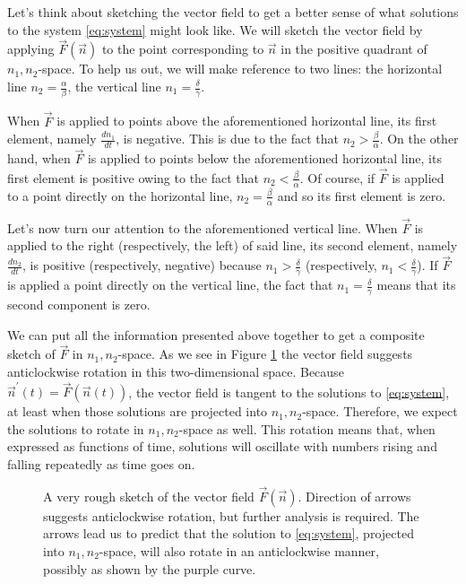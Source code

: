 \documentclass[../book.tex]{subfiles}
\begin{document}
Let's think about sketching the vector field to get a better sense of what solutions to the system \eqref{eq:system} might look like. We will sketch the vector field by applying \(\vec{F}(\vec{n})\) to the point corresponding to \(\vec{n}\) in the positive quadrant of \(n_1,n_2\)-space. To help us out, we will make reference to two lines: the horizontal line \(n_2 = \frac{\alpha}{\beta}\), the vertical line \(n_1 = \frac{\delta}{\gamma}\).

When \(\vec{F}\) is applied to points above the aforementioned horizontal line, its first element, namely \(\frac{dn_1}{dt}\), is negative. This is due to the fact that \(n_2 > \frac{\beta}{\alpha}\). On the other hand, when \(\vec{F}\) is applied to points below the aforementioned horizontal line, its first element is positive owing to the fact that \(n_2 < \frac{\beta}{\alpha}\). Of course, if \(\vec{F}\) is applied to a point directly on the horizontal line, \(n_2 = \frac{\beta}{\alpha}\) and so its first element is zero.

Let's now turn our attention to the aforementioned vertical line. When \(\vec{F}\) is applied to the right (respectively, the left) of said line, its second element, namely \(\frac{dn_2}{dt}\), is positive (respectively, negative) because \(n_1 > \frac{\delta}{\gamma}\) (respectively, \(n_1 < \frac{\delta}{\gamma}\)). If \(\vec{F}\) is applied a point directly on the vertical line, the fact that \(n_1 = \frac{\delta}{\gamma}\) means that its second component is zero.

We can put all the information presented above together to get a composite sketch of \(\vec{F}\) in \(n_1,n_2\)-space. As we see in Figure \ref{fig:predprey1} the vector field suggests anticlockwise rotation in this two-dimensional space. Because \(\vec{n}^{ \prime}(t) = \vec{F}(\vec{n}(t))\), the vector field is tangent to the solutions to \eqref{eq:system}, at least when those solutions are projected into \(n_1,n_2\)-space. Therefore, we expect the solutions to rotate in \(n_1,n_2\)-space as well. This rotation means that, when expressed as functions of time, solutions will oscillate with numbers rising and falling repeatedly as time goes on.

\begin{figure}[htbp]
  \centering
  \caption{A very rough sketch of the vector field \(\vec{F}(\vec{n})\). Direction of arrows suggests anticlockwise rotation, but further analysis is required. The arrows lead us to predict that the solution to \eqref{eq:system}, projected into \(n_1,n_2\)-space, will also rotate in an anticlockwise manner, possibly as shown by the purple curve.}
  \label{fig:predprey1}
\end{figure}
\end{document}
